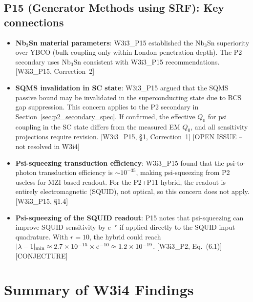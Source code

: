 \documentclass[11pt,twocolumn]{article}
\newcommand{\lam}{\lambda}
\newcommand{\ee}[1]{\times 10^{#1}}
\theoremstyle{definition}
\theoremstyle{remark}
\begin{document}
\subsection{P15 (Generator Methods using SRF): Key connections}
\label{sec:p15_xref}

\begin{itemize}[nosep]
\item \textbf{Nb$_3$Sn material parameters}: W3i3\_P15 established
the Nb$_3$Sn superiority over YBCO (bulk coupling only within
London penetration depth). The P2 secondary uses Nb$_3$Sn
consistent with W3i3\_P15 recommendations.
[W3i3\_P15, Correction~2]
\item \textbf{SQMS invalidation in SC state}: W3i3\_P15 argued that
the SQMS passive bound may be invalidated in the superconducting state
due to BCS gap suppression. This concern applies to the P2 secondary
in Section~\ref{sec:p2_secondary_spec}. If confirmed, the effective
$Q_0$ for psi coupling in the SC state differs from the measured
EM $Q_0$, and all sensitivity projections require revision.
[W3i3\_P15, \S1, Correction~1] [OPEN ISSUE -- not resolved in W3i4]
\item \textbf{Psi-squeezing transduction efficiency}: W3i3\_P15 found
that the psi-to-photon transduction efficiency is $\sim 10^{-35}$,
making psi-squeezing from P2 useless for MZI-based readout.
For the P2+P11 hybrid, the readout is entirely electromagnetic
(SQUID), not optical, so this concern does not apply. [W3i3\_P15, \S1.4]
\item \textbf{Psi-squeezing of the SQUID readout}: P15 notes that
psi-squeezing can improve SQUID sensitivity by $e^{-r}$ if applied
directly to the SQUID input quadrature. With $r = 10$, the hybrid
could reach $|\lam-1|_{\rm min} \approx 2.7\ee{-15}\times e^{-10}
\approx 1.2\ee{-19}$. [W3i3\_P2, Eq.~(6.1)] [CONJECTURE]
\end{itemize}

\section{Summary of W3i4 Findings}
\label{sec:summary}
\end{document}
